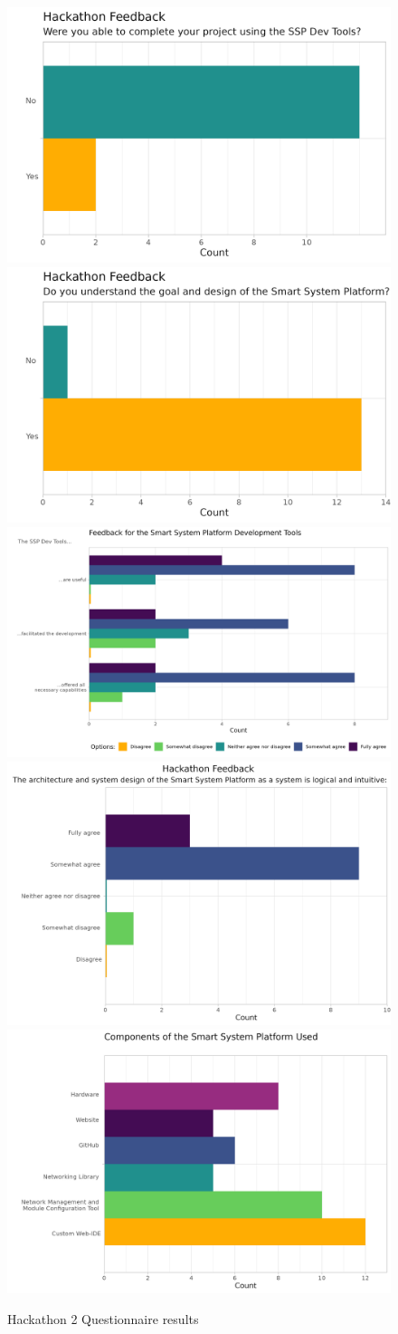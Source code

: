 \begin{figure}[H]
    \centering
    \includegraphics[width=.35\linewidth]{rstudio/survey/plots/completion.png}
    \includegraphics[width=.35\linewidth]{rstudio/survey/plots/logic.png}
    \includegraphics[width=.75\linewidth]{rstudio/survey/plots/ssp.png}
    \includegraphics[width=.49\linewidth]{rstudio/survey/plots/architecture.png}
    \includegraphics[width=.49\linewidth]{rstudio/survey/plots/component.png}
    \vspace{\ftspace}
    \caption{Hackathon 2 Questionnaire results}
    \vspace{\ftspace}
    \label{fig:hack2_questions}
\end{figure}

